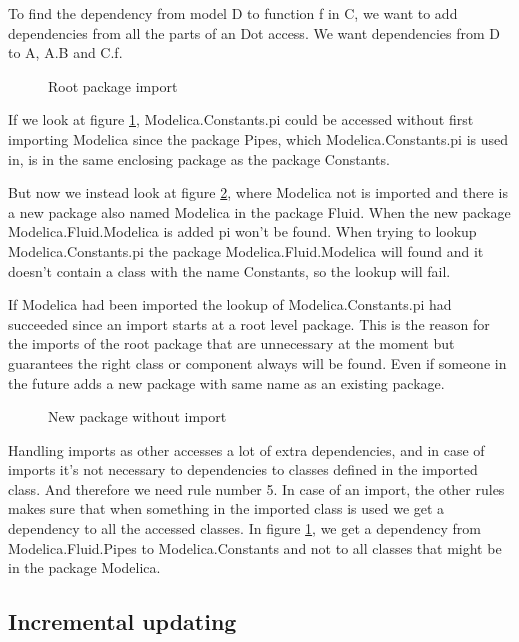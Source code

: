 \documentclass{cslthse-msc}
\begin{document}
To find the dependency from model D to function f in C, we want to add dependencies from all the parts of an Dot access. We want dependencies from D to A, A.B and C.f.

\begin{figure}[H]
    \centering
    
    \caption{Root package import}
    \label{fig:importRootPackage}
\end{figure}

If we look at figure \ref{fig:importRootPackage}, Modelica.Constants.pi could be accessed without first importing Modelica since the package Pipes, which Modelica.Constants.pi is used in, is in the same enclosing package as the package Constants.

But now we instead look at figure \ref{fig:newPackageWithoutImport}, where Modelica not is imported and there is a new package also named Modelica in the package Fluid. When the new package Modelica.Fluid.Modelica is added pi won't be found. When trying to lookup Modelica.Constants.pi the package Modelica.Fluid.Modelica will found and it doesn't contain a class with the name Constants, so the lookup will fail.

If Modelica had been imported the lookup of Modelica.Constants.pi had succeeded since an import starts at a root level package. This is the reason for the imports of the root package that are unnecessary at the moment but guarantees the right class or component always will be found. Even if someone in the future adds a new package with same name as an existing package.

\begin{figure}[H]
    \centering
    
    \caption{New package without import}
    \label{fig:newPackageWithoutImport}
\end{figure}

Handling imports as other accesses a lot of extra dependencies, and in case of imports it's not necessary to dependencies to classes defined in the imported class. And therefore we need rule number 5. In case of an import, the other rules makes sure that when something in the imported class is used we get a dependency to all the accessed classes. In figure \ref{fig:importRootPackage}, we get a dependency from Modelica.Fluid.Pipes to Modelica.Constants and not to all classes that might be in the package Modelica.


\subsection{Incremental updating}
\end{document}
